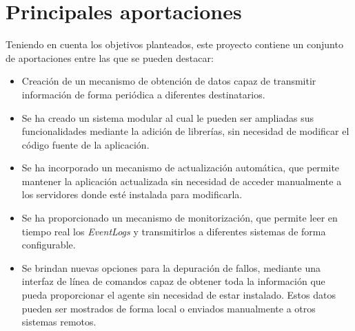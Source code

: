 \label{sec:conc}
\section{Principales aportaciones}
    Teniendo en cuenta los objetivos planteados, este proyecto contiene un conjunto de aportaciones entre las que se pueden destacar:
    
    \begin{itemize}
        \item Creación de un mecanismo de obtención de datos capaz de transmitir información de forma periódica a diferentes destinatarios.
        
        \item Se ha creado un sistema modular al cual le pueden ser ampliadas sus funcionalidades mediante la adición de librerías, sin necesidad de modificar el código fuente de la aplicación.
        
        \item Se ha incorporado un mecanismo de actualización automática, que permite mantener la aplicación actualizada sin necesidad de acceder manualmente a los servidores donde esté instalada para modificarla.
        
        \item Se ha proporcionado un mecanismo de monitorización, que permite leer en tiempo real los \textit{EventLogs} y transmitirlos a diferentes sistemas de forma configurable.
        
        \item Se brindan nuevas opciones para la depuración de fallos, mediante una interfaz de línea de comandos capaz de obtener toda la información que pueda proporcionar el agente sin necesidad de estar instalado. Estos datos pueden ser mostrados de forma local o enviados manualmente a otros sistemas remotos.
    \end{itemize}





